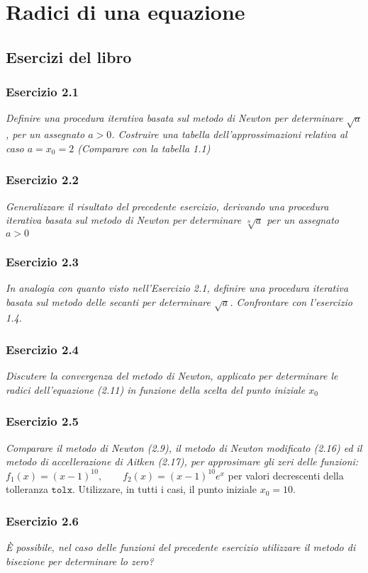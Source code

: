 \chapter{Radici di una equazione}
\section{Esercizi del libro}
\subsection{Esercizio 2.1}
\emph{Definire una procedura iterativa basata sul metodo di Newton per determinare $\sqrt{a}$, per un assegnato $a>0$. Costruire una tabella dell'approssimazioni relativa al caso $a=x_{0}=2$ (Comparare con la tabella 1.1)}
\subsection{Esercizio 2.2}
\emph{Generalizzare il risultato del precedente esercizio, derivando una procedura iterativa basata sul metodo di Newton per determinare $\sqrt[n]{a}$ per un assegnato $a>0$}
\subsection{Esercizio 2.3}
\emph{In analogia con quanto visto nell'Esercizio 2.1, definire una procedura iterativa basata sul metodo delle secanti per determinare $\sqrt{a}$. Confrontare con l'esercizio 1.4.}
\subsection{Esercizio 2.4}
\emph{Discutere la convergenza del metodo di Newton, applicato per determinare le radici dell'equazione (2.11) in funzione della scelta del punto iniziale $x_{0}$}
\subsection{Esercizio 2.5}
\emph{Comparare il metodo di Newton (2.9), il metodo di Newton modificato (2.16) ed il metodo di accellerazione di Aitken (2.17), per approsimare gli zeri delle funzioni:\\}
\center $f_{1}(x) = (x-1)^{10}, \qquad f_{2}(x)=(x-1)^{10}e^{x} $
\flushleft per valori decrescenti della tolleranza $\mathtt{tolx}$. Utilizzare, in tutti i casi, il punto iniziale $x_{0}=10$.
\subsection{Esercizio 2.6}
\emph{È possibile, nel caso delle funzioni del precedente esercizio utilizzare il metodo di bisezione per determinare lo zero?}
